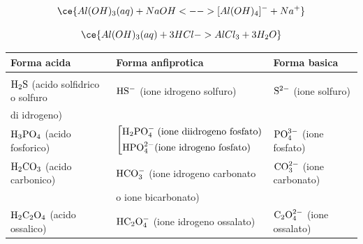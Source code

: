 $$\ce{Al(OH)_3(aq) + NaOH <--> [Al(OH)_4]^- + Na^+}$$

$$\ce{Al(OH)_3(aq) + 3HCl -> AlCl_3 + 3H_2O}$$

\begin{center}
    \footnotesize\begin{tabular}{|p{5.2cm}p{5.4cm}p{3.8cm}|}
    \hline
    \textbf{Forma acida} & \textbf{Forma anfiprotica} & \textbf{Forma basica}\\
    \hline
    &&\\[-1.2ex]
    $\rm H_2S$ (acido solfidrico o solfuro & $\rm HS^-$ (ione idrogeno solfuro) & $\rm S^{2-}$ (ione solfuro)\\
    di idrogeno)&&\\[0.7ex]
    $\rm H_3PO_4$ (acido fosforico) &  \hspace{-0.3cm}$\left[
\begin{aligned}
    \text{H}_2\text{PO}_4^- \; \text{(ione diidrogeno fosfato)}\\
    \text{HPO}_4^{2-} \text{(ione idrogeno fosfato)} \hspace{0.4cm}
\end{aligned}
\right .$
 & $\rm PO_4^{3-}$ (ione fosfato)\\[3ex]
 $\rm H_2CO_3$ (acido carbonico) & $\rm HCO_3^-$ (ione idrogeno carbonato& $\rm CO_3^{2-}$ (ione carbonato)\\
 & o ione bicarbonato) &\\[0.7ex]
 $\rm H_2C_2O_4$ (acido ossalico) & $\rm HC_2O_4^-$ (ione idrogeno ossalato) & $\rm C_2O_4^{2-}$ (ione ossalato)\\[0.7ex]
 \hline
    \end{tabular}
\end{center}

